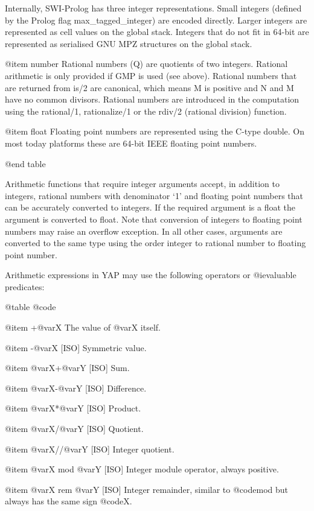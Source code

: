 {{{{      Internally, SWI-Prolog has three integer representations. Small
      integers (defined by the Prolog flag max_tagged_integer) are
      encoded directly. Larger integers are represented as cell values
      on the global stack. Integers that do not fit in 64-bit are
      represented as serialised GNU MPZ structures on the global stack.

@item number
      Rational numbers (Q) are quotients of two integers. Rational
      arithmetic is only provided if GMP is used (see above). Rational
      numbers that are returned from is/2 are canonical, which means M
      is positive and N and M have no common divisors. Rational numbers
      are introduced in the computation using the rational/1,
      rationalize/1 or the rdiv/2 (rational division) function. 

@item float
      Floating point numbers are represented using the C-type double. On most today platforms these are 64-bit IEEE floating point numbers.

@end table

Arithmetic functions that require integer arguments accept, in addition
to integers, rational numbers with denominator `1' and floating point
numbers that can be accurately converted to integers. If the required
argument is a float the argument is converted to float. Note that
conversion of integers to floating point numbers may raise an overflow
exception. In all other cases, arguments are converted to the same type
using the order integer to rational number to floating point number.


Arithmetic expressions in YAP may use the following operators or
@i{evaluable predicates}:

@table @code

@item +@var{X}
The value of @var{X} itself.

@item -@var{X} [ISO]
Symmetric value.

@item @var{X}+@var{Y} [ISO]
Sum.

@item @var{X}-@var{Y} [ISO]
Difference.

@item @var{X}*@var{Y} [ISO]
Product.

@item @var{X}/@var{Y} [ISO]
Quotient.

@item @var{X}//@var{Y} [ISO]
Integer quotient.

@item @var{X} mod @var{Y} [ISO]
Integer module operator, always positive.

@item @var{X} rem @var{Y} [ISO]
Integer remainder, similar to @code{mod} but always has the same sign
@code{X}.

}}}}

